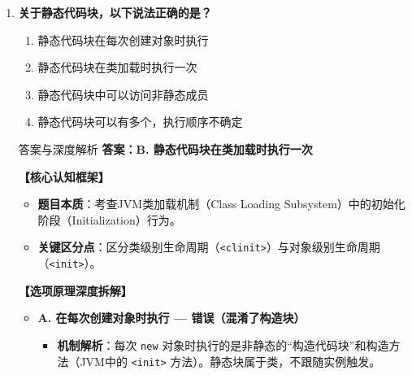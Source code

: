\documentclass[12pt, a4paper]{ctexart}
\begin{document}
\begin{enumerate}[label=\textbf{\arabic*.}]
\begin{bluebox}{答案与深度解析}
		      \textbf{【应背诵知识点（命题人思维版）】}
		      \begin{enumerate}[leftmargin=*, nosep]
			      \item \textbf{字面量默认类型}：整数默认 \texttt{int}，浮点数默认 \texttt{double}。
			      \item \textbf{隐式转换特权}：\texttt{byte/short/char} 接受 \texttt{int} 常量赋值时，只要不越界，\textbf{免强转}。
			      \item \textbf{高频陷阱清单}：
			            \begin{itemize}
				            \item 陷阱1：\texttt{float f = 1.0;} → 漏写 f 必报错。
				            \item 陷阱2：\texttt{long l = 2147483648;} → 报错！因为右侧默认是 int，超出了 int 的最大值。必须写成 \texttt{2147483648L}。
			            \end{itemize}
		      \end{enumerate}
	      \end{bluebox}
	      \vspace{1em}

	\item \textbf{关于静态代码块，以下说法正确的是？}
	      \begin{enumerate}[label=\Alph*.]
		      \item 静态代码块在每次创建对象时执行
		      \item 静态代码块在类加载时执行一次
		      \item 静态代码块中可以访问非静态成员
		      \item 静态代码块可以有多个，执行顺序不确定
	      \end{enumerate}

	      \begin{bluebox}{答案与深度解析}
		      \textbf{答案：B. 静态代码块在类加载时执行一次}

		      \textbf{【核心认知框架】}
		      \begin{itemize}[leftmargin=*, nosep]
			      \item \textbf{题目本质}：考查JVM类加载机制（Class Loading Subsystem）中的初始化阶段（Initialization）行为。
			      \item \textbf{关键区分点}：区分类级别生命周期（\texttt{<clinit>}）与对象级别生命周期（\texttt{<init>}）。
		      \end{itemize}

		      \textbf{【选项原理深度拆解】}
		      \begin{itemize}[leftmargin=*, nosep]
			      \item \textbf{A. 在每次创建对象时执行 — 错误（混淆了构造块）}
			            \begin{itemize}[leftmargin=*, nosep]
				            \item \textbf{机制解析}：每次 \texttt{new} 对象时执行的是非静态的“构造代码块”和构造方法（JVM中的 \texttt{<init>} 方法）。静态块属于类，不跟随实例触发。
			            \end{itemize}


\end{itemize}
\end{bluebox}
\end{enumerate}
\end{document}
